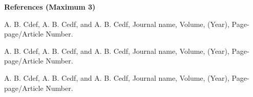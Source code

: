 \documentclass[11pt]{article}
\newcommand{\BodyFont}{\fontsize{11}{13}\selectfont}
\newcommand{\SmallBold}{\fontsize{11}{13}\selectfont\bfseries}
\begin{document}
{\SmallBold \textcolor{wordred}{References (Maximum 3)}\par}

\vspace{6pt}

{\BodyFont A. B. Cdef, A. B. Cedf, and A. B. Cedf, Journal name, Volume, (Year), Page-page/Article Number. \par}

\vspace{4pt}

{\BodyFont A. B. Cdef, A. B. Cedf, and A. B. Cedf, Journal name, Volume, (Year), Page-page/Article Number. \par}

\vspace{4pt}

{\BodyFont A. B. Cdef, A. B. Cedf, and A. B. Cedf, Journal name, Volume, (Year), Page-page/Article Number. \par}
\end{document}
